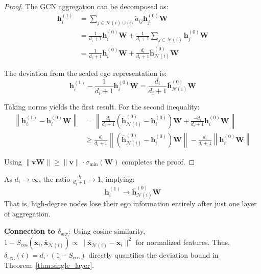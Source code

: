 \begin{proof}
The GCN aggregation can be decomposed as:
\begin{align}
\mathbf{h}_i^{(1)} &= \sum_{j \in \mathcal{N}(i) \cup \{i\}} \tilde{a}_{ij} \mathbf{h}_j^{(0)} \mathbf{W} \\
&= \frac{1}{d_i+1} \mathbf{h}_i^{(0)} \mathbf{W} + \frac{1}{d_i+1} \sum_{j \in \mathcal{N}(i)} \mathbf{h}_j^{(0)} \mathbf{W} \\
&= \frac{1}{d_i+1} \mathbf{h}_i^{(0)} \mathbf{W} + \frac{d_i}{d_i+1} \bar{\mathbf{h}}_{\mathcal{N}(i)}^{(0)} \mathbf{W}
\end{align}

The deviation from the scaled ego representation is:
\begin{equation}
\mathbf{h}_i^{(1)} - \frac{1}{d_i+1}\mathbf{h}_i^{(0)}\mathbf{W} = \frac{d_i}{d_i+1} \bar{\mathbf{h}}_{\mathcal{N}(i)}^{(0)} \mathbf{W}
\end{equation}

Taking norms yields the first result. For the second inequality:
\begin{align}
\left\| \mathbf{h}_i^{(1)} - \mathbf{h}_i^{(0)}\mathbf{W} \right\| &= \left\| \frac{d_i}{d_i+1}(\bar{\mathbf{h}}_{\mathcal{N}(i)}^{(0)} - \mathbf{h}_i^{(0)})\mathbf{W} + \frac{-d_i}{d_i+1}\mathbf{h}_i^{(0)}\mathbf{W} \right\| \\
&\geq \frac{d_i}{d_i+1} \left\| (\bar{\mathbf{h}}_{\mathcal{N}(i)}^{(0)} - \mathbf{h}_i^{(0)})\mathbf{W} \right\| - \frac{d_i}{d_i+1}\left\|\mathbf{h}_i^{(0)}\mathbf{W}\right\|
\end{align}

Using $\|\mathbf{v}\mathbf{W}\| \geq \|\mathbf{v}\| \cdot \sigma_{\min}(\mathbf{W})$ completes the proof.
\end{proof}

\begin{corollary}
\label{cor:high_degree}
As $d_i \to \infty$, the ratio $\frac{d_i}{d_i+1} \to 1$, implying:
\begin{equation}
\mathbf{h}_i^{(1)} \to \bar{\mathbf{h}}_{\mathcal{N}(i)}^{(0)} \mathbf{W}
\end{equation}
That is, high-degree nodes lose their ego information entirely after just one layer of aggregation.
\end{corollary}

\textbf{Connection to $\delta_{\text{agg}}$}: Using cosine similarity, $1 - S_{\cos}(\mathbf{x}_i, \bar{\mathbf{x}}_{\mathcal{N}(i)}) \propto \|\bar{\mathbf{x}}_{\mathcal{N}(i)} - \mathbf{x}_i\|^2$ for normalized features. Thus, $\delta_{\text{agg}}(i) = d_i \cdot (1 - S_{\cos})$ directly quantifies the deviation bound in Theorem~\ref{thm:single_layer}.

